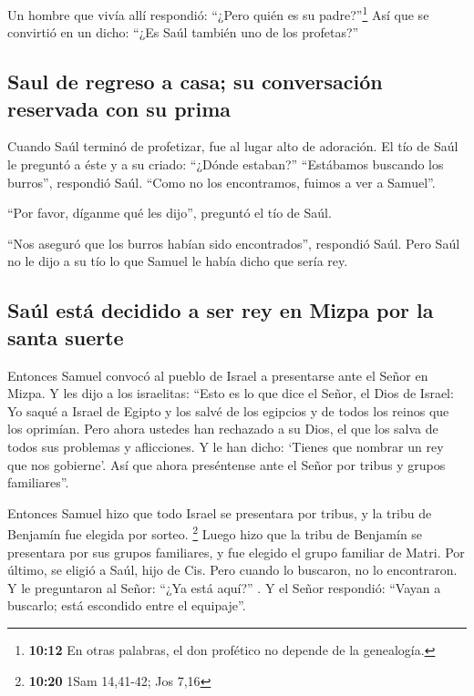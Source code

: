  Un hombre que vivía allí respondió: ``¿Pero quién es su
padre?''\footnote{\textbf{10:12} En otras palabras, el don profético no
  depende de la genealogía.} Así que se convirtió en un dicho: ``¿Es
Saúl también uno de los profetas?''

\hypertarget{saul-de-regreso-a-casa-su-conversaciuxf3n-reservada-con-su-prima}{%
\subsection{Saul de regreso a casa; su conversación reservada con su
prima}\label{saul-de-regreso-a-casa-su-conversaciuxf3n-reservada-con-su-prima}}

 Cuando Saúl terminó de profetizar, fue al lugar alto de
adoración.  El tío de Saúl le preguntó a éste y a su
criado: ``¿Dónde estaban?'' ``Estábamos buscando los burros'', respondió
Saúl. ``Como no los encontramos, fuimos a ver a Samuel''.

 ``Por favor, díganme qué les dijo'', preguntó el tío de
Saúl.

 ``Nos aseguró que los burros habían sido encontrados'',
respondió Saúl. Pero Saúl no le dijo a su tío lo que Samuel le había
dicho que sería rey.

\hypertarget{sauxfal-estuxe1-decidido-a-ser-rey-en-mizpa-por-la-santa-suerte}{%
\subsection{Saúl está decidido a ser rey en Mizpa por la santa
suerte}\label{sauxfal-estuxe1-decidido-a-ser-rey-en-mizpa-por-la-santa-suerte}}

 Entonces Samuel convocó al pueblo de Israel a
presentarse ante el Señor en Mizpa.  Y les dijo a los
israelitas: ``Esto es lo que dice el Señor, el Dios de Israel: Yo saqué
a Israel de Egipto y los salvé de los egipcios y de todos los reinos que
los oprimían.  Pero ahora ustedes han rechazado a su
Dios, el que los salva de todos sus problemas y aflicciones. Y le han
dicho: `Tienes que nombrar un rey que nos gobierne'. Así que ahora
preséntense ante el Señor por tribus y grupos familiares''.

 Entonces Samuel hizo que todo Israel se presentara por
tribus, y la tribu de Benjamín fue elegida por sorteo. \footnote{\textbf{10:20}
  1Sam 14,41-42; Jos 7,16}  Luego hizo que la tribu de
Benjamín se presentara por sus grupos familiares, y fue elegido el grupo
familiar de Matri. Por último, se eligió a Saúl, hijo de Cis. Pero
cuando lo buscaron, no lo encontraron.  Y le preguntaron
al Señor: ``¿Ya está aquí?'' . Y el Señor respondió: ``Vayan a buscarlo;
está escondido entre el equipaje''.

